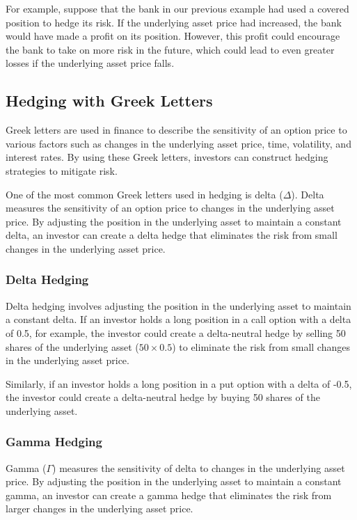 \documentclass{article}
\theoremstyle{mytheoremstyle}
\theoremstyle{mytheoremstyle}
\theoremstyle{myproblemstyle}
\begin{document}
For example, suppose that the bank in our previous example had used a covered position to hedge its risk. If the underlying asset price had increased, the bank would have made a profit on its position. However, this profit could encourage the bank to take on more risk in the future, which could lead to even greater losses if the underlying asset price falls.




\subsection{Hedging with Greek Letters}

Greek letters are used in finance to describe the sensitivity of an option price to various factors such as changes in the underlying asset price, time, volatility, and interest rates. By using these Greek letters, investors can construct hedging strategies to mitigate risk.

One of the most common Greek letters used in hedging is delta ($\Delta$). Delta measures the sensitivity of an option price to changes in the underlying asset price. By adjusting the position in the underlying asset to maintain a constant delta, an investor can create a delta hedge that eliminates the risk from small changes in the underlying asset price.

\subsubsection{Delta Hedging}

Delta hedging involves adjusting the position in the underlying asset to maintain a constant delta. If an investor holds a long position in a call option with a delta of 0.5, for example, the investor could create a delta-neutral hedge by selling 50 shares of the underlying asset ($50 \times 0.5$) to eliminate the risk from small changes in the underlying asset price.

Similarly, if an investor holds a long position in a put option with a delta of -0.5, the investor could create a delta-neutral hedge by buying 50 shares of the underlying asset.

\subsubsection{Gamma Hedging}

Gamma ($\Gamma$) measures the sensitivity of delta to changes in the underlying asset price. By adjusting the position in the underlying asset to maintain a constant gamma, an investor can create a gamma hedge that eliminates the risk from larger changes in the underlying asset price.
\end{document}
